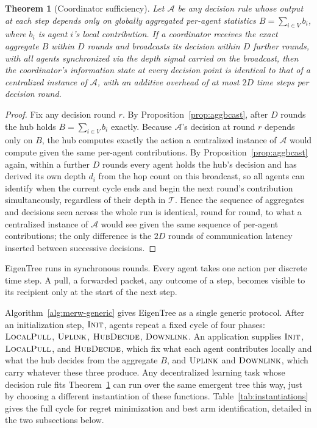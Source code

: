 \documentclass[letterpaper]{article} %
\newtheorem{theorem}{Theorem}
\begin{document}
\begin{theorem}[Coordinator sufficiency]
\label{thm:coordinator}
Let $\mathcal{A}$ be any decision rule whose output at each step depends only
	on globally aggregated per-agent statistics $B = \sum_{i \in V} b_i$, where
	$b_i$ is agent $i$'s local contribution. If a coordinator receives the
	exact aggregate $B$ within $D$ rounds and broadcasts its decision within
	$D$ further rounds, with all agents synchronized via the depth signal
	carried on the broadcast, then the coordinator's information state at every
	decision point is identical to that of a centralized instance of
	$\mathcal{A}$, with an additive overhead of at most $2D$ time steps per
	decision round.
\end{theorem}

\begin{proof}
Fix any decision round $r$. By Proposition~\ref{prop:aggbcast}, after $D$
	rounds the hub holds $B = \sum_{i\in V} b_i$ exactly. Because
	$\mathcal{A}$'s decision at round $r$ depends only on $B$, the hub computes
	exactly the action a centralized instance of $\mathcal{A}$ would compute
	given the same per-agent contributions. By Proposition~\ref{prop:aggbcast}
	again, within a further $D$ rounds every agent holds the hub's decision and
	has derived its own depth $d_i$ from the hop count on this broadcast, so
	all agents can identify when the current cycle ends and begin the next
	round's contribution simultaneously, regardless of their depth in
	$\mathcal{T}$. Hence the sequence of aggregates and decisions seen across
	the whole run is identical, round for round, to what a centralized instance
	of $\mathcal{A}$ would see given the same sequence of per-agent
	contributions; the only difference is the $2D$ rounds of communication
	latency inserted between successive decisions.
\end{proof}

EigenTree runs in synchronous rounds. Every agent takes one action per discrete
time step. A pull, a forwarded packet, any outcome of a step, becomes visible
to its recipient only at the start of the next step.

Algorithm~\ref{alg:merw-generic} gives EigenTree as a single generic protocol.
After an initialization step, $\textsc{Init}$, agents repeat a fixed cycle of
four phases: $\textsc{LocalPull}$, $\textsc{Uplink}$, $\textsc{HubDecide}$,
$\textsc{Downlink}$. An application supplies $\textsc{Init}$,
$\textsc{LocalPull}$, and $\textsc{HubDecide}$, which fix what each agent
contributes locally and what the hub decides from the aggregate $B$, and
$\textsc{Uplink}$ and $\textsc{Downlink}$, which carry whatever these three
produce. Any decentralized learning task whose decision rule fits
Theorem~\ref{thm:coordinator} can run over the same emergent tree this way,
just by choosing a different instantiation of these functions.
Table~\ref{tab:instantiations} gives the full cycle for regret minimization and
best arm identification, detailed in the two subsections below.
\end{document}
